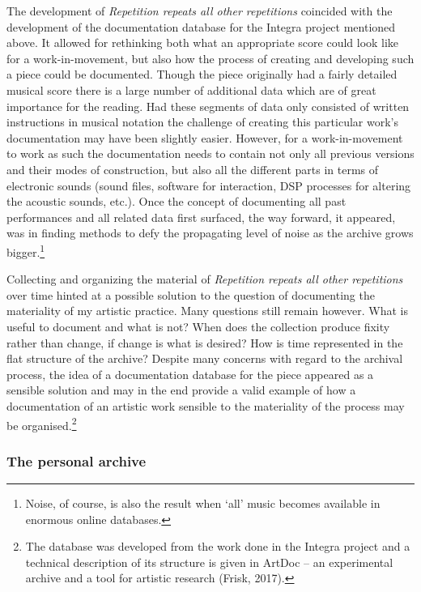 The development of \emph{Repetition repeats all other repetitions}
coincided with the development of the documentation database for the
Integra project mentioned above. It allowed for rethinking both what an
appropriate score could look like for a work-in-movement, but also how
the process of creating and developing such a piece could be documented.
Though the piece originally had a fairly detailed musical score there is
a large number of additional data which are of great importance for the
reading. Had these segments of data only consisted of written
instructions in musical notation the challenge of creating this
particular work's documentation may have been slightly easier. However,
for a work-in-movement to work as such the documentation needs to
contain not only all previous versions and their modes of construction,
but also all the different parts in terms of electronic sounds (sound
files, software for interaction, DSP processes for altering the acoustic
sounds, etc.). Once the concept of documenting all past performances and
all related data first surfaced, the way forward, it appeared, was in
finding methods to defy the propagating level of noise as the archive
grows bigger.\footnote{Noise, of course, is also the result when `all'
  music becomes available in enormous online databases.}

Collecting and organizing the material of \emph{Repetition repeats all
other repetitions} over time hinted at a possible solution to the
question of documenting the materiality of my artistic practice. Many
questions still remain however. What is useful to document and what is
not? When does the collection produce fixity rather than change, if
change is what is desired? How is time represented in the flat structure
of the archive? Despite many concerns with regard to the archival
process, the idea of a documentation database for the piece appeared as
a sensible solution and may in the end provide a valid example of how a
documentation of an artistic work sensible to the materiality of the
process may be organised.\footnote{The database was developed from the
  work done in the Integra project and a technical description of its
  structure is given in ArtDoc -- an experimental archive and a tool for
  artistic research (Frisk, 2017).}

\hypertarget{the-personal-archive}{%
\subsubsection{The personal archive}\label{the-personal-archive}}

